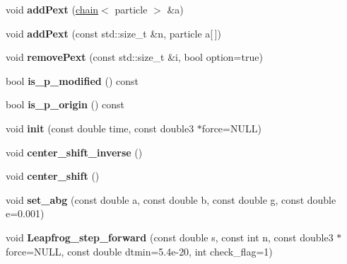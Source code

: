 \begin{DoxyCompactItemize}
\item 
\hypertarget{classchain_a2e2533d167715198a0316ce037dbd34f}{
void {\bfseries addPext} (\hyperlink{classchain}{chain}$<$ particle $>$ \&a)}
\label{classchain_a2e2533d167715198a0316ce037dbd34f}

\item 
\hypertarget{classchain_a314cb21138e081fbc6b1436a645d1d71}{
void {\bfseries addPext} (const std::size\_\-t \&n, particle a\mbox{[}$\,$\mbox{]})}
\label{classchain_a314cb21138e081fbc6b1436a645d1d71}

\item 
\hypertarget{classchain_af3f2369d9909eb2592270ebb43bfb033}{
void {\bfseries removePext} (const std::size\_\-t \&i, bool option=true)}
\label{classchain_af3f2369d9909eb2592270ebb43bfb033}

\item 
\hypertarget{classchain_a82aa8a7fbc0a59dc80a6664a89831ff5}{
bool {\bfseries is\_\-p\_\-modified} () const }
\label{classchain_a82aa8a7fbc0a59dc80a6664a89831ff5}

\item 
\hypertarget{classchain_aafaed894c8cc06a39e53e60c9464098b}{
bool {\bfseries is\_\-p\_\-origin} () const }
\label{classchain_aafaed894c8cc06a39e53e60c9464098b}

\item 
\hypertarget{classchain_ab8d6469cd14e32f5ee3b5aba24bdc601}{
void {\bfseries init} (const double time, const double3 $\ast$force=NULL)}
\label{classchain_ab8d6469cd14e32f5ee3b5aba24bdc601}

\item 
\hypertarget{classchain_a623ee5de9bc2a5548e2e3b026fa083d9}{
void {\bfseries center\_\-shift\_\-inverse} ()}
\label{classchain_a623ee5de9bc2a5548e2e3b026fa083d9}

\item 
\hypertarget{classchain_a4282f016d3dd10774815ba7c32c0e021}{
void {\bfseries center\_\-shift} ()}
\label{classchain_a4282f016d3dd10774815ba7c32c0e021}

\item 
\hypertarget{classchain_a53ba548d770aacf76e9d5db7d2035a03}{
void {\bfseries set\_\-abg} (const double a, const double b, const double g, const double e=0.001)}
\label{classchain_a53ba548d770aacf76e9d5db7d2035a03}

\item 
\hypertarget{classchain_aca74f3caca3d6c0ba909de4511993160}{
void {\bfseries Leapfrog\_\-step\_\-forward} (const double s, const int n, const double3 $\ast$force=NULL, const double dtmin=5.4e-\/20, int check\_\-flag=1)}
\label{classchain_aca74f3caca3d6c0ba909de4511993160}


\end{DoxyCompactItemize}
